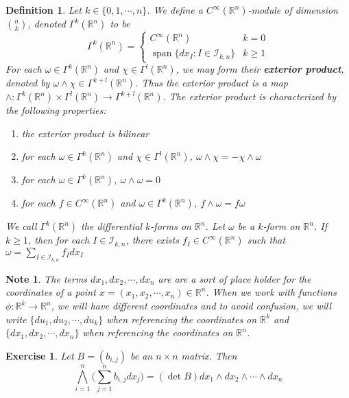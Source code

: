 \documentclass[12pt]{amsart}
\newtheorem{defn}[thm]{Definition}
\newtheorem{note}[thm]{Note}
\newtheorem{ex}[thm]{Exercise}
\DeclareMathOperator{\spn}{span}
\newcommand{\om}{\omega}
\newcommand{\R}{\mathbb{R}}
\newcommand{\MI}{\mathcal{I}}
\begin{document}
	\begin{defn}
		Let $k \in \{0, 1, \cdots, n\}$. We define a $C^{\infty}(\R^n)$-module of dimension ${n \choose k}$, denoted $\Gamma^k(\R^n)$ to be 
		\[
		\Gamma^k(\R^n) =
		\begin{cases}
			C^{\infty}(\R^n) & k = 0 \\
			\spn \{ dx_I: I \in \MI_{k,n} \} & k \geq 1
		\end{cases}
		\]
		For each $\om \in \Gamma^k(\R^n)$ and $\chi \in \Gamma^l(\R^n)$,   we may form their \textbf{exterior product}, denoted by $\om \wedge \chi \in \Gamma^{k+l}(\R^n)$. Thus the exterior product is a map $\wedge : \Gamma^k(\R^n) \times \Gamma^l(\R^n)\rightarrow \Gamma^{k+l}(\R^n)$. The exterior product is characterized by the following properties:
		\begin{enumerate}
			\item the exterior product is bilinear
			\item for each $\om \in \Gamma^k(\R^n)$ and $\chi \in \Gamma^l(\R^n)$, $\om \wedge \chi = - \chi \wedge \om$ 
			\item for each $\om \in \Gamma^k(\R^n)$, $\om \wedge \om = 0$
			\item for each $f \in C^{\infty}(\R^n)$ and $ \om \in \Gamma^k(\R^n)$, $f \wedge \om = f \om$
		\end{enumerate}
		We call $\Gamma^k(\R^n)$ the differential $k$-forms on $\R^n$. Let $\om$ be a $k$-form on $\R^n$. If $k \geq 1$, then for each $I \in \MI_{k,n}$, there exists $f_I \in C^{\infty}(\R^n)$ such that $\om = \sum\limits_{I \in \MI_{k,n}} f_I dx_I$
	\end{defn}
	
	
	\begin{note}
		The terms $dx_1, dx_2, \cdots, dx_n$ are are a sort of place holder for the coordinates of a point $x = (x_1, x_2, \cdots, x_n) \in \R^n$. When we work with functions $\phi: \R^k \rightarrow \R^n$, we will have different coordinates and to avoid confusion, we will write $\{du_1, du_2, \cdots, du_k\}$ when referencing the coordinates on $\R^k$ and $\{dx_1, dx_2, \cdots, dx_n\}$ when referencing the coordinates on $\R^n$. 
	\end{note}

	\begin{ex}
		Let $B = (b_{i,j})$ be an $n\times n$ matrix. Then $$\bigwedge_{i=1}^n \bigg(\sum_{j=1}^n b_{i,j}dx_j\bigg) = (\det B) dx_1 \wedge dx_2 \wedge \cdots \wedge dx_n$$
	\end{ex}
\end{document}
